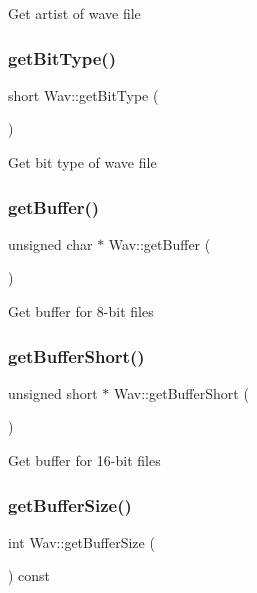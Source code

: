 Get artist of wave file \mbox{\label{classWav_a4e410575086d989e3f52dd56ecf262c8}} 
\subsubsection{\texorpdfstring{get\+Bit\+Type()}{getBitType()}}
{\footnotesize\ttfamily short Wav\+::get\+Bit\+Type (\begin{DoxyParamCaption}{ }\end{DoxyParamCaption})}

Get bit type of wave file \mbox{\label{classWav_a2daf07a90ed34789e3a1874973d9bd36}} 
\subsubsection{\texorpdfstring{get\+Buffer()}{getBuffer()}}
{\footnotesize\ttfamily unsigned char $\ast$ Wav\+::get\+Buffer (\begin{DoxyParamCaption}{ }\end{DoxyParamCaption})}

Get buffer for 8-\/bit files \mbox{\label{classWav_aae0134529648af492714daada51fb728}} 
\subsubsection{\texorpdfstring{get\+Buffer\+Short()}{getBufferShort()}}
{\footnotesize\ttfamily unsigned short $\ast$ Wav\+::get\+Buffer\+Short (\begin{DoxyParamCaption}{ }\end{DoxyParamCaption})}

Get buffer for 16-\/bit files \mbox{\label{classWav_a71fdfa1d9f5e7c1b86f07bbff4249dca}} 
\subsubsection{\texorpdfstring{get\+Buffer\+Size()}{getBufferSize()}}
{\footnotesize\ttfamily int Wav\+::get\+Buffer\+Size (\begin{DoxyParamCaption}{ }\end{DoxyParamCaption}) const}

